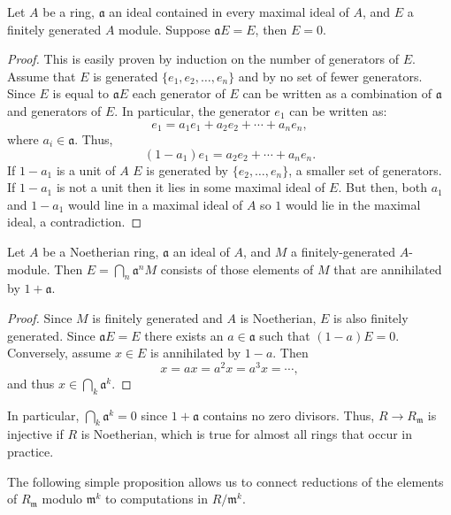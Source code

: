 \begin{proposition}[Nakayama] 
  Let $A$ be a ring, $\mathfrak{a}$ an ideal contained in every
  maximal ideal of $A$, and $E$ a finitely generated $A$ module.
  Suppose $\mathfrak{a}E = E$, then $E = 0$.
\end{proposition}

\begin{proof}
This is easily proven by induction on the number of generators of
$E$. Assume that $E$ is generated $\{e_1, e_2, \ldots, e_n\}$ and by
no set of fewer generators.  Since $E$ is equal to $\mathfrak{a}E$
each generator of $E$ can be written as a combination of
$\mathfrak{a}$ and generators of $E$.  In particular, the generator
$e_1$ can be written as:
\[
e_1 = a_1 e_1 + a_2 e_2 + \cdots + a_n e_n,
\]
where $a_i \in \mathfrak{a}$.  Thus,
\[
(1 - a_1) e_1 = a_2 e_2 + \cdots + a_n e_n.
\]
If $1 - a_1$ is a unit of $A$ $E$ is generated by $\{e_2,\ldots,
e_n\}$, a smaller set of generators.  If $1-a_1$ is not a unit then it
lies in some maximal ideal of $E$.  But then, both $a_1$ and $1- a_1$
would line in a maximal ideal of $A$ so $1$ would lie in the maximal
ideal, a contradiction.
\end{proof}

\begin{proposition}[Krull]
Let $A$ be a Noetherian ring, $\mathfrak{a}$ an ideal of $A$, and $M$ a
finitely-generated $A$-module. Then $E = \bigcap_n \mathfrak{a}^n M$ consists
of those elements of $M$ that are annihilated by $1 + \mathfrak{a}$. 
\end{proposition}

\begin{proof}
Since $M$ is finitely generated and $A$ is Noetherian, $E$ is also
finitely generated. Since $\mathfrak{a}E = E$ there exists an $a \in
\mathfrak{a}$ such that $(1-a)E = 0$.  Conversely, assume $x \in E$ is
annihilated by $1 - a$.  Then
\[
x = ax = a^2 x = a^3 x = \cdots,
\]
and thus $x \in \bigcap_k \mathfrak{a}^k$.
\end{proof}


In particular, $\bigcap_k \mathfrak{a}^k = 0$ since $1 + \mathfrak{a}$
contains no zero divisors.  Thus, $R \rightarrow R_\mathfrak{m}$ is
injective if $R$ is Noetherian, which is true
for almost all rings that occur in practice.  

The following simple proposition allows us to connect reductions of the 
elements of $R_\mathfrak{m}$ modulo $\mathfrak{m}^k$ to computations in 
$R/\mathfrak{m}^k$.

